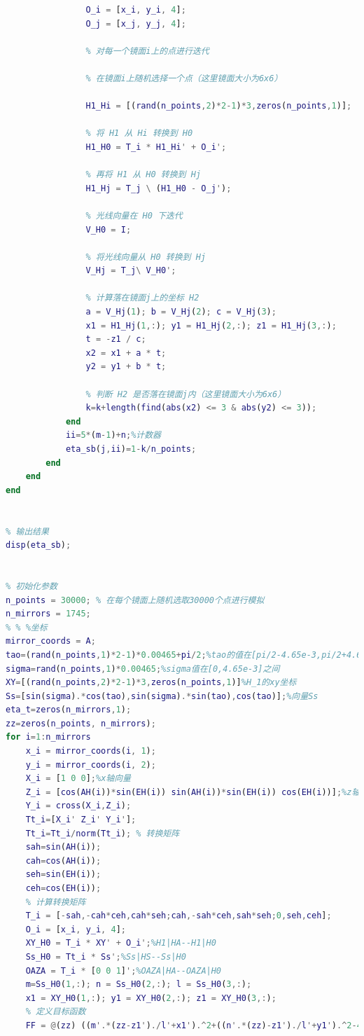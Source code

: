 \documentclass[withoutpreface,bwprint]{cumcmthesis} %
\begin{document}
\begin{appendices}
\begin{lstlisting}[language=Matlab]
                % 镜面i和镜面j中心在H0下的坐标
                O_i = [x_i, y_i, 4];
                O_j = [x_j, y_j, 4];

                % 对每一个镜面i上的点进行迭代

                % 在镜面i上随机选择一个点（这里镜面大小为6x6）

                H1_Hi = [(rand(n_points,2)*2-1)*3,zeros(n_points,1)];

                % 将 H1 从 Hi 转换到 H0
                H1_H0 = T_i * H1_Hi' + O_i';

                % 再将 H1 从 H0 转换到 Hj
                H1_Hj = T_j \ (H1_H0 - O_j');

                % 光线向量在 H0 下迭代
                V_H0 = I;

                % 将光线向量从 H0 转换到 Hj
                V_Hj = T_j\ V_H0';

                % 计算落在镜面j上的坐标 H2
                a = V_Hj(1); b = V_Hj(2); c = V_Hj(3);
                x1 = H1_Hj(1,:); y1 = H1_Hj(2,:); z1 = H1_Hj(3,:);
                t = -z1 / c;
                x2 = x1 + a * t;
                y2 = y1 + b * t;

                % 判断 H2 是否落在镜面j内（这里镜面大小为6x6）
                k=k+length(find(abs(x2) <= 3 & abs(y2) <= 3));
            end
            ii=5*(m-1)+n;%计数器
            eta_sb(j,ii)=1-k/n_points;
        end
    end
end


% 输出结果
disp(eta_sb);


% 初始化参数
n_points = 30000; % 在每个镜面上随机选取30000个点进行模拟
n_mirrors = 1745;
% % %坐标
mirror_coords = A;
tao=(rand(n_points,1)*2-1)*0.00465+pi/2;%tao的值在[pi/2-4.65e-3,pi/2+4.65e-3]之间
sigma=rand(n_points,1)*0.00465;%sigma值在[0,4.65e-3]之间
XY=[(rand(n_points,2)*2-1)*3,zeros(n_points,1)]%H_1的xy坐标
Ss=[sin(sigma).*cos(tao),sin(sigma).*sin(tao),cos(tao)];%向量Ss
eta_t=zeros(n_mirrors,1);
zz=zeros(n_points, n_mirrors);
for i=1:n_mirrors
    x_i = mirror_coords(i, 1);
    y_i = mirror_coords(i, 2);
    X_i = [1 0 0];%x轴向量
    Z_i = [cos(AH(i))*sin(EH(i)) sin(AH(i))*sin(EH(i)) cos(EH(i))];%z轴向量
    Y_i = cross(X_i,Z_i);
    Tt_i=[X_i' Z_i' Y_i'];
    Tt_i=Tt_i/norm(Tt_i); % 转换矩阵
    sah=sin(AH(i));
    cah=cos(AH(i));
    seh=sin(EH(i));
    ceh=cos(EH(i));
    % 计算转换矩阵
    T_i = [-sah,-cah*ceh,cah*seh;cah,-sah*ceh,sah*seh;0,seh,ceh];
    O_i = [x_i, y_i, 4];
    XY_H0 = T_i * XY' + O_i';%H1|HA--H1|H0
    Ss_H0 = Tt_i * Ss';%Ss|HS--Ss|H0
    OAZA = T_i * [0 0 1]';%OAZA|HA--OAZA|H0
    m=Ss_H0(1,:); n = Ss_H0(2,:); l = Ss_H0(3,:);
    x1 = XY_H0(1,:); y1 = XY_H0(2,:); z1 = XY_H0(3,:);
    % 定义目标函数
    FF = @(zz) ((m'.*(zz-z1')./l'+x1').^2+((n'.*(zz)-z1')./l'+y1').^2-49/4).^2;


\end{lstlisting}
\end{appendices}
\end{document}
